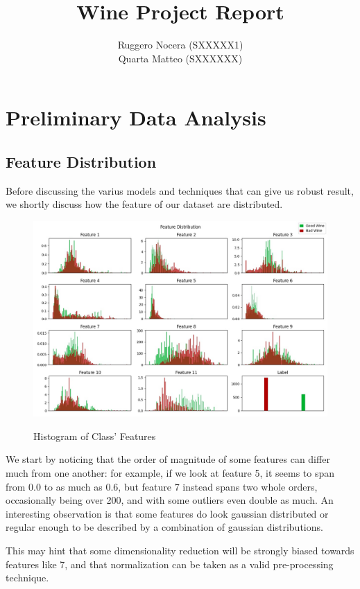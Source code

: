 \documentclass[twocolumn]{article}
\title{Wine Project Report}
\author{Ruggero Nocera (SXXXXX1) \\ Quarta Matteo (SXXXXXX)}
\date{}
\begin{document}
\maketitle
\tableofcontents


\section{Preliminary Data Analysis}
\subsection{Feature Distribution}

Before discussing the varius models and techniques that can give us robust result, we shortly discuss how the feature of our dataset are distributed.

\begin{figure}[H]
    \caption{Histogram of Class' Features}
    {\includegraphics[width=\linewidth]{dist.jpg}}
    \label{featureshist}
\end{figure}

We start by noticing that the order of magnitude of some features can differ much from one another: for example, if we look at feature 5, it seems to span from 0.0 to as much as 0.6, but feature 7 instead spans two whole orders, occasionally being over 200, and with some outliers even double as much. An interesting observation is that some features do look gaussian distributed or regular enough to be described by a combination of gaussian distributions.

This may hint that some dimensionality reduction will be strongly biased towards features like 7, and that normalization can be taken as a valid pre-processing technique.
\end{document}
